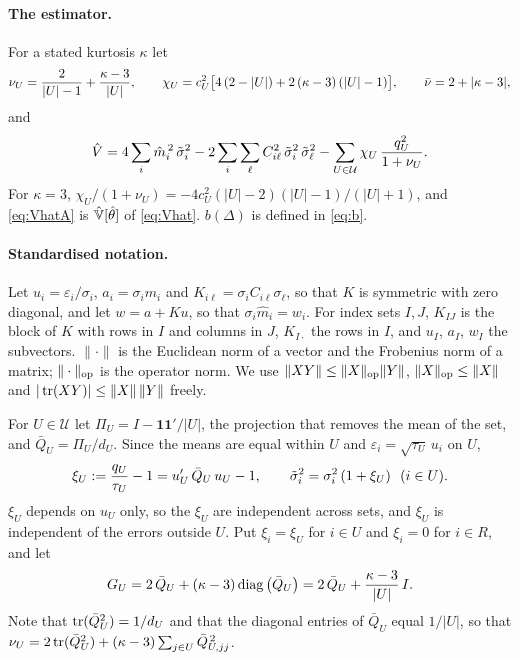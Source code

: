 \paragraph{The estimator.} For a stated kurtosis $\kappa$ let
\begin{equation}\label{eq:nuh}
\nu_U=\frac{2}{|U|-1}+\frac{\kappa-3}{|U|},\qquad
\chi_U=c_U^2\big[4\,(2-|U|)+2\,(\kappa-3)\,(|U|-1)\big],\qquad \bar\nu=2+|\kappa-3| ,
\end{equation}
and
\begin{equation}\label{eq:VhatA}
\hat V=4\sum_i\hat m_i^{\,2}\,\tilde\sigma_i^2-2\sum_i\sum_\ell C_{i\ell}^2\,\tilde\sigma_i^2\,\tilde\sigma_\ell^2
-\sum_{U\in\mathcal{U}}\chi_U\,\frac{q_U^2}{1+\nu_U}.
\end{equation}
For $\kappa=3$, $\chi_U/(1+\nu_U)=-4c_U^2(|U|-2)(|U|-1)/(|U|+1)$, and \eqref{eq:VhatA} is
$\hat{\mathbb{V}}[\hat\theta]$ of \eqref{eq:Vhat}. $b(\Delta)$ is defined in \eqref{eq:b}.

\paragraph{Standardised notation.} Let $u_i=\varepsilon_i/\sigma_i$, $a_i=\sigma_im_i$ and
$K_{i\ell}=\sigma_iC_{i\ell}\sigma_\ell$, so that $K$ is symmetric with zero diagonal, and let $w=a+Ku$, so that
$\sigma_i\hat m_i=w_i$. For index sets $I,J$, $K_{IJ}$ is the block of $K$ with rows in $I$ and columns in $J$,
$K_{I\cdot}$ the rows in $I$, and $u_I$, $a_I$, $w_I$ the subvectors. $\|\cdot\|$ is the Euclidean norm of a vector
and the Frobenius norm of a matrix; $\|\cdot\|_{\mathrm{op}}$ is the operator norm. We use $\|XY\|\le\|X\|_{\mathrm{op}}\|Y\|$,
$\|X\|_{\mathrm{op}}\le\|X\|$ and $|\operatorname{tr}(XY)|\le\|X\|\,\|Y\|$ freely.

For $U\in\mathcal{U}$ let $\Pi_U=I-\mathbf{1}\mathbf{1}'/|U|$, the projection that removes the mean of the set, and
$\bar Q_U=\Pi_U/d_U$. Since the means are equal within $U$ and $\varepsilon_i=\sqrt{\tau_U}\,u_i$ on $U$,
\begin{equation}\label{eq:xi}
\xi_U:=\frac{q_U}{\tau_U}-1=u_U'\,\bar Q_U\,u_U-1,\qquad \tilde\sigma_i^2=\sigma_i^2\,(1+\xi_U)\ \ (i\in U).
\end{equation}
$\xi_U$ depends on $u_U$ only, so the $\xi_U$ are independent across sets, and $\xi_U$ is independent of the errors
outside $U$. Put $\xi_i=\xi_U$ for $i\in U$ and $\xi_i=0$ for $i\in R$, and let
\begin{equation}\label{eq:G}
G_U=2\,\bar Q_U+(\kappa-3)\operatorname{diag}\big(\bar Q_U\big)=2\,\bar Q_U+\frac{\kappa-3}{|U|}\,I .
\end{equation}
Note that $\operatorname{tr}(\bar Q_U^2)=1/d_U$ and that the diagonal entries of $\bar Q_U$ equal $1/|U|$, so that
$\nu_U=2\operatorname{tr}(\bar Q_U^2)+(\kappa-3)\sum_{j\in U}\bar Q_{U,jj}^{\,2}$.

